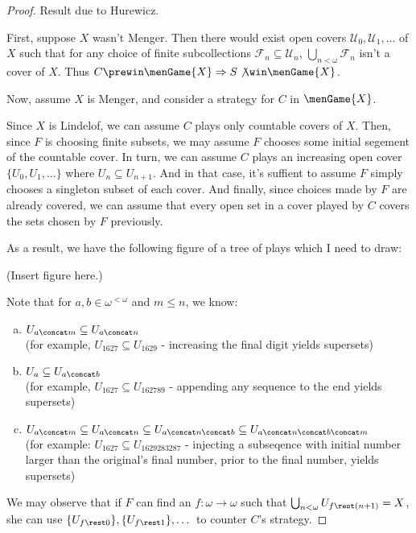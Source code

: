   \begin{proof}
    Result due to Hurewicz.

    First, suppose $X$ wasn't Menger. Then there would exist open covers $\mathcal{U}_0,\mathcal{U}_1,\dots$ of $X$ such that for any choice of finite subcollections $\mathcal{F}_n\subseteq\mathcal{U}_n$, $\bigcup_{n<\omega} \mathcal{F}_n$ isn't a cover of $X$. Thus $C\prewin\menGame{X} \Rightarrow S \not\win\menGame{X}$.

    Now, assume $X$ is Menger, and consider a strategy for $C$ in $\menGame{X}$.

    Since $X$ is Lindelof, we can assume $C$ plays only countable covers of $X$. Then, since $F$ is choosing finite subsets, we may assume $F$ chooses some initial segement of the countable cover. In turn, we can assume $C$ plays an increasing open cover $\{U_0,U_1,\dots\}$ where $U_n\subseteq U_{n+1}$. And in that case, it's suffient to assume $F$ simply chooses a singleton subset of each cover. And finally, since choices made by $F$ are already covered, we can assume that every open set in a cover played by $C$ covers the sets chosen by $F$ previously.

    As a result, we have the following figure of a tree of plays which I need to draw:

    (Insert figure here.)

    Note that for $a,b\in\omega^{<\omega}$ and $m\leq n$, we know:
      \begin{enumerate}[(a)]
        \item $U_{a\concat m}\subseteq U_{a\concat n}$ \\ (for example, $U_{1627} \subseteq U_{1629}$ - increasing the final digit yields supersets)
        \item $U_a \subseteq U_{a\concat b}$ \\ (for example, $U_{1627}\subseteq U_{162789}$ - appending any sequence to the end yields supersets)
        \item $U_{a\concat m} \subseteq U_{a\concat n} \subseteq U_{a\concat n\concat b} \subseteq U_{a\concat n\concat b\concat m}$ \\ (for example: $U_{1627} \subseteq U_{1629283287}$ - injecting a subseqence with initial number larger than the original's final number, prior to the final number, yields supersets)
      \end{enumerate}

    We may observe that if $F$ can find an $f:\omega\to\omega$ such that $\bigcup_{n<\omega}U_{f\rest (n+1)} = X$, she can use $\{U_{f\rest 0}\}, \{U_{f\rest 1}\}, \dots$ to counter $C$'s strategy.


\end{proof}

